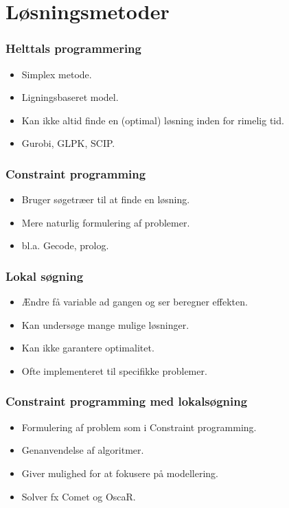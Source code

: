 \documentclass[12pt]{beamer}
\begin{document}

\section{Løsningsmetoder}
\begin{frame}
\frametitle{Helttals programmering}
\begin{itemize}[<+->]  
\item Simplex metode.
\item Ligningsbaseret model.
\item Kan ikke altid finde en (optimal) løsning inden for rimelig tid.
\item Gurobi, GLPK, SCIP.
\end{itemize}
\begin{center}
\end{center}
\end{frame}


\begin{frame}
\frametitle{Constraint programming}
\begin{itemize}[<+->]
\item Bruger søgetræer til at finde en løsning.
\item Mere naturlig formulering af problemer.
\item bl.a. Gecode, prolog.
\end{itemize}
\end{frame}

\begin{frame}
\frametitle{Lokal søgning}
\begin{itemize}[<+->]
\item Ændre få variable ad gangen og ser beregner effekten.
\item Kan undersøge mange mulige løsninger.
\item Kan ikke garantere optimalitet.
\item Ofte implementeret til specifikke problemer.
\end{itemize}
\end{frame}


\begin{frame}
\frametitle{Constraint programming med lokalsøgning}
\begin{itemize}[<+->]
\item Formulering af problem som i Constraint programming. 
\item Genanvendelse af algoritmer.
\item Giver mulighed for at fokusere på modellering.
\item Solver fx Comet og OscaR.
\end{itemize}
\end{frame}
\end{document}
